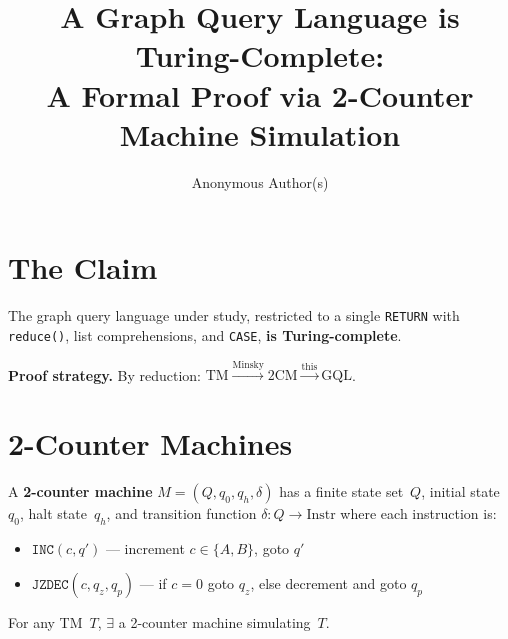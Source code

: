 \documentclass[sigconf, anonymous, review, nonacm]{acmart}
\title{A Graph Query Language is Turing-Complete: \\
  A Formal Proof via 2-Counter Machine Simulation}
\author{Anonymous Author(s)}
\affiliation{%
  \institution{Omitted for review}
}
\begin{document}
\maketitle

\section{The Claim}

\begin{claimbox}
The graph query language under study, restricted to a single
\texttt{RETURN} with \texttt{reduce()}, list comprehensions, and
\texttt{CASE}, \textbf{is Turing-complete}.
\end{claimbox}

\textbf{Proof strategy.} By reduction:
$\text{TM} \xrightarrow{\text{Minsky}} \text{2CM} \xrightarrow{\text{this}} \text{GQL}$.

\section{2-Counter Machines}

A \textbf{2-counter machine} $M = (Q, q_0, q_h, \delta)$ has a finite
state set~$Q$, initial state~$q_0$, halt state~$q_h$, and transition
function $\delta: Q \to \text{Instr}$ where each instruction is:

\begin{itemize}[leftmargin=1.2em,nosep]
  \item $\texttt{INC}(c, q')$ --- increment $c \in \{A,B\}$, goto $q'$
  \item $\texttt{JZDEC}(c, q_z, q_p)$ --- if $c{=}0$ goto $q_z$, else
        decrement and goto $q_p$
\end{itemize}

\begin{factbox}
For any TM~$T$, $\exists$ a 2-counter machine simulating~$T$.
\end{factbox}
\end{document}
